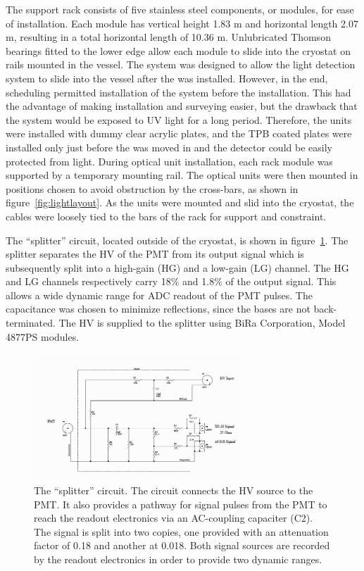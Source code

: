 The support rack consists of five stainless steel components, or modules, for ease of installation.  Each module has vertical height 1.83 m and horizontal length 2.07 m, resulting in a total horizontal length of 10.36 m.  Unlubricated Thomson bearings fitted to the lower edge allow each module to slide into the cryostat on rails mounted in the vessel.   The system was designed to allow the light detection system to slide into the vessel after the \lartpc was installed.  However, in the end, scheduling permitted installation of the system before the \lartpc installation.  This had the advantage of making installation and surveying easier, but the drawback that the system would be exposed to UV light for a long period.  Therefore, the units were installed with dummy clear acrylic plates, and the TPB coated plates were installed only just before the \lartpc was moved in and the detector could be easily protected from light.  During optical unit installation, each rack module was supported by a temporary mounting rail.  The optical units were then mounted in positions chosen to avoid obstruction by the \lartpc cross-bars, as shown in figure~\ref{fig:lightlayout}.  As the units were mounted and slid into the cryostat, the cables were loosely tied to the bars of the rack for support and constraint.  

The ``splitter'' circuit, located outside of the cryostat, is shown in figure~\ref{fig:splitter}. The splitter separates the HV of the PMT from its output signal which is subsequently split into a high-gain (HG) and a low-gain (LG) channel. The HG and LG channels respectively carry 18$\%$ and 1.8$\%$ of the output signal.  This allows a wide dynamic range for ADC readout of the PMT pulses.  The capacitance was chosen to minimize reflections, since the bases are not back-terminated.  The HV is supplied to the splitter using BiRa Corporation, Model 4877PS modules.

\begin{figure}[h]
\centering 
\includegraphics[width=0.7\textwidth]{./light_figures/splitter_modified.png}
\caption{The ``splitter'' circuit.  The circuit connects the HV source to the PMT. It also provides a pathway for signal pulses from the PMT to reach the readout electronics via an AC-coupling capaciter (C2).  The signal is split into two copies, one provided with an attenuation factor of 0.18 and another at 0.018. Both signal sources are recorded by the readout electronics in order to provide two dynamic ranges.}
\label{fig:splitter}
\end{figure}


